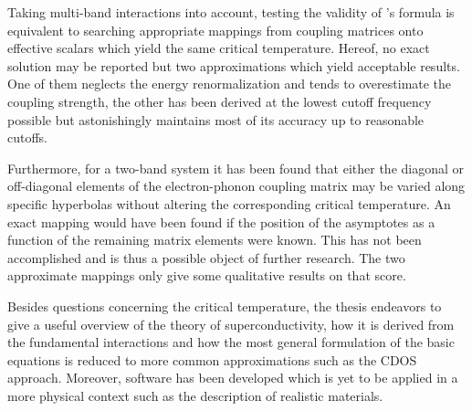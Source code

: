 Taking multi-band interactions into account, testing the validity of
's formula is equivalent to searching appropriate mappings from
coupling matrices onto effective scalars which yield the same critical
temperature. Hereof, no exact solution may be reported but two approximations
which yield acceptable results. One of them neglects the energy renormalization
and tends to overestimate the coupling strength, the other has been derived at
the lowest cutoff frequency possible but astonishingly maintains most of its
accuracy up to reasonable cutoffs.

Furthermore, for a two-band system it has been found that either the diagonal or
off-diagonal elements of the electron-phonon coupling matrix may be varied along
specific hyperbolas without altering the corresponding critical temperature. An
exact mapping would have been found if the position of the asymptotes as a
function of the remaining matrix elements were known. This has not been
accomplished and is thus a possible object of further research. The two
approximate mappings only give some qualitative results on that score.

Besides questions concerning the critical temperature, the thesis endeavors to
give a useful overview of the  theory of superconductivity, how
it is derived from the fundamental interactions and how the most general
formulation of the basic equations is reduced to more common approximations such
as the CDOS approach. Moreover, software has been developed which is yet to be
applied in a more physical context such as the description of realistic
materials.
